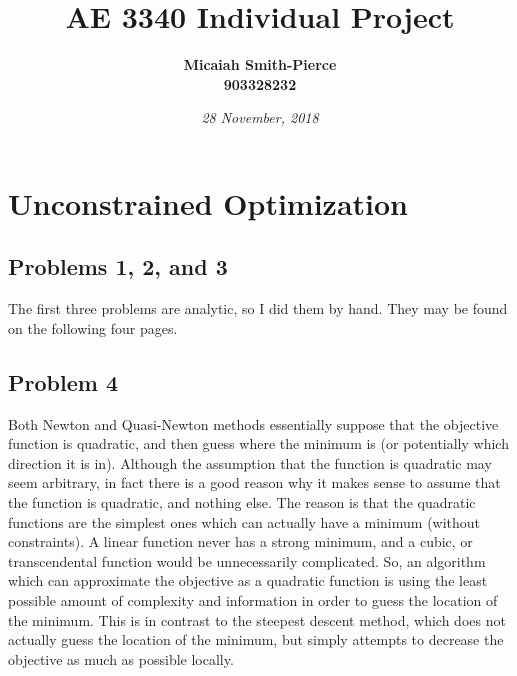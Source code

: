 \documentclass[twoside]{report} %
\title{\bf AE 3340 Individual Project\\}
\author{\bf Micaiah Smith-Pierce\\
903328232\\
}
\date{\it 28 November, 2018} %
\begin{document}
\maketitle
\cleardoublepage
 
\tableofcontents
\cleardoublepage

\chapter{Unconstrained Optimization}

\section{Problems 1, 2, and 3}
The first three problems are analytic, so I did them by hand. They may be found on the following four pages.
\cleardoublepage
\section{Problem 4}
Both Newton and Quasi-Newton methods essentially suppose that the objective function is quadratic, and then guess
where the minimum is (or potentially which direction it is in). Although the assumption that the function is quadratic
may seem arbitrary, in fact there is a good reason why it makes sense to assume that the function is quadratic, and
nothing else. The reason is that the quadratic functions are the simplest ones which can actually have a minimum (without
constraints). A linear function never has a strong minimum, and a cubic, or transcendental function would be unnecessarily
complicated. So, an algorithm which can approximate the objective as a quadratic function is using the least possible amount
of complexity and information in order to guess the location of the minimum. This is in contrast to the steepest descent method,
which does not actually guess the location of the minimum, but simply attempts to decrease the objective as much as possible
locally.
\end{document}
